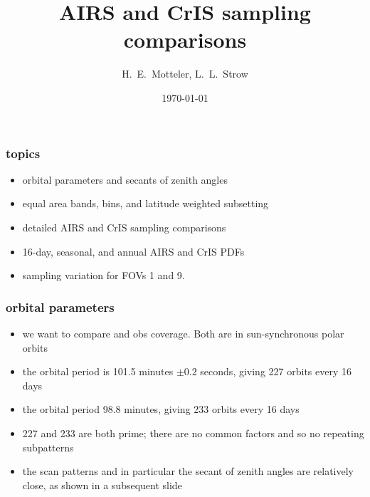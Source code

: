 \documentclass[11pt]{beamer}
\title{AIRS and CrIS sampling comparisons}
\author{H.~E.~Motteler, L.~L.~Strow}
\institute{
  UMBC Atmospheric Spectroscopy Lab \\
  Joint Center for Earth Systems Technology \\
}
\date{\today}
\begin{document}
\begin{frame}[plain]
\titlepage
\end{frame}
\begin{frame}
\frametitle{topics}

\begin{itemize}

  \item orbital parameters and secants of zenith angles

  \item equal area bands, bins, and latitude weighted subsetting

  \item detailed AIRS and CrIS sampling comparisons

  \item 16-day, seasonal, and annual AIRS and CrIS PDFs

  \item sampling variation for {\cris} FOVs 1 and 9.

\end{itemize}

\end{frame}
\begin{frame}
\frametitle{orbital parameters}

\begin{itemize}

  \item we want to compare {\airs} and {\cris} obs coverage.  Both
    are in sun-synchronous polar orbits

  \item the {\cris} orbital period is 101.5 minutes $\pm 0.2$
    seconds, giving 227 orbits every 16 days

  \item the {\airs} orbital period 98.8 minutes, giving 233 orbits
    every 16 days

  \item 227 and 233 are both prime; there are no common factors and
    so no repeating subpatterns

  \item the scan patterns and in particular the secant of zenith
    angles are relatively close, as shown in a subsequent slide

\end{itemize}
\end{frame}
\end{document}
